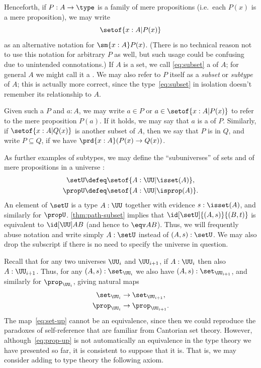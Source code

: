 \label{defn:setof}%
Henceforth, if $P:A\to \type$ is a family of mere propositions (i.e.\ each $P(x)$ is a mere proposition), we may write
%
\begin{equation}
  \label{eq:subset}
  \setof{x:A | P(x)}
\end{equation}
%
as an alternative notation for $\sm{x:A} P(x)$.
(There is no technical reason not to use this notation for arbitrary $P$ as well, but such usage could be confusing due to unintended connotations.)
If $A$ is a set, we call \eqref{eq:subset} a 
%
%
of $A$; for general $A$ we might call it a .
%
We may also refer to $P$ itself as a \emph{subset} or \emph{subtype} of $A$; this is actually more correct, since the type~\eqref{eq:subset} in isolation doesn't remember its relationship to $A$.

Given such a $P$ and $a:A$, we may write $a\in P$ or $a\in \setof{x:A | P(x)}$ to refer to the mere proposition $P(a)$.
If it holds, we may say that $a$ is a  of $P$.
Similarly, if $\setof{x:A | Q(x)}$ is another subset of $A$, then we say that $P$ is 
%
%
in $Q$, and write $P\subseteq Q$, if we have $\prd{x:A}(P(x)\rightarrow Q(x))$.

As further examples of subtypes, we may define the ``subuniverses'' of sets and of mere propositions in a universe \UU:
\begin{align*}
  \setU &\defeq \setof{A:\UU | \isset(A) },\\
  \propU &\defeq \setof{A:\UU | \isprop(A) }.
\end{align*}
An element of $\setU$ is a type $A:\UU$ together with evidence $s:\isset(A)$, and similarly for $\propU$.
\cref{thm:path-subset} implies that $\id[\setU]{(A,s)}{(B,t)}$ is equivalent to $\id[\UU]AB$ (and hence to $\eqv AB$).
Thus, we will frequently abuse notation and write simply $A:\setU$ instead of $(A,s):\setU$.
We may also drop the subscript \UU if there is no need to specify the universe in question.

Recall that for any two universes $\UU_i$ and $\UU_{i+1}$, if $A:\UU_i$ then also $A:\UU_{i+1}$.
Thus, for any $(A,s):\set_{\UU_i}$ we also have $(A,s):\set_{\UU_{i+1}}$, and similarly for $\prop_{\UU_i}$, giving natural maps
\begin{align}
  \set_{\UU_i} &\to \set_{\UU_{i+1}}\label{eq:set-up},\\
  \prop_{\UU_i} &\to \prop_{\UU_{i+1}}.\label{eq:prop-up}
\end{align}
The map~\eqref{eq:set-up} cannot be an equivalence, since then we could reproduce the paradoxes of self-reference that are familiar from Cantorian set theory.
However, although~\eqref{eq:prop-up} is not automatically an equivalence in the type theory we have presented so far, it is consistent to suppose that it is.
That is, we may consider adding to type theory the following axiom.

